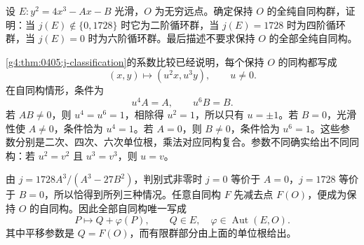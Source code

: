 \begin{exercise}
	\label{g4:ex:0405:origin-automorphisms}
	设 \(E:y^2=4x^3-Ax-B\) 光滑，\(O\) 为无穷远点。确定保持 \(O\) 的全纯自同构群，证明：当 \(j(E)\notin\{0,1728\}\) 时它为二阶循环群，当 \(j(E)=1728\) 时为四阶循环群，当 \(j(E)=0\) 时为六阶循环群。最后描述不要求保持 \(O\) 的全部全纯自同构。
\end{exercise}
\begin{solution}
	\cref{g4:thm:0405:j-classification}的系数比较已经说明，每个保持 \(O\) 的同构都写成
	\[
		(x,y)\longmapsto(u^2x,u^3y),\qquad u\ne0.
	\]
	在自同构情形，条件为
	\[
		u^4A=A,\qquad u^6B=B.
	\]
	若 \(AB\ne0\)，则 \(u^4=u^6=1\)，相除得 \(u^2=1\)，所以只有 \(u=\pm1\)。若 \(B=0\)，光滑性使 \(A\ne0\)，条件恰为 \(u^4=1\)。若 \(A=0\)，则 \(B\ne0\)，条件恰为 \(u^6=1\)。这些参数分别是二次、四次、六次单位根，乘法对应同构复合。参数不同确实给出不同同构：若 \(u^2=v^2\) 且 \(u^3=v^3\)，则 \(u=v\)。

	由 \(j=1728A^3/(A^3-27B^2)\)，判别式非零时 \(j=0\) 等价于 \(A=0\)，\(j=1728\) 等价于 \(B=0\)，所以恰得到所列三种情况。任意自同构 \(F\) 先减去点 \(F(O)\)，便成为保持 \(O\) 的自同构。因此全部自同构唯一写成
	\[
		P\longmapsto Q+\varphi(P),
		\qquad Q\in E,\quad \varphi\in\operatorname{Aut}(E,O).
	\]
	其中平移参数是 \(Q=F(O)\)，而有限群部分由上面的单位根给出。
\end{solution}

